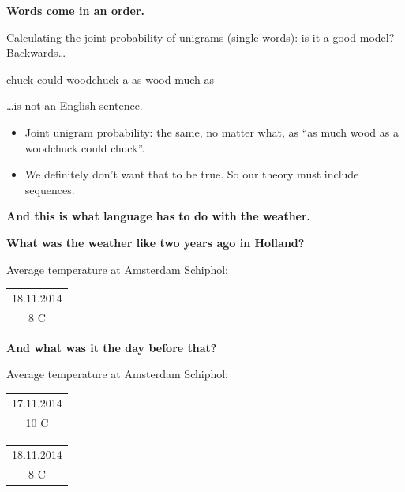 \documentclass{beamer}
\newcommand{\placard}[1]{
  \begin{frame}
    \begin{center}
      \huge
      \textbf{#1}
    \end{center}
  \end{frame}
}
\newcommand{\pagestepalt}[2]{
  \begin{frame}[t]
    \begin{minipage}[t][0.26\textheight][t]{\textwidth}
      \begin{center}
        \huge
        \textbf{#1}
      \end{center}
    \end{minipage}
    
    \begin{minipage}[t][0.7\textheight][c]{\textwidth}
      #2
    \end{minipage}
  \end{frame}
}
\begin{document}
\pagestepalt{Words come in an order.}{
  Calculating the joint probability of \alert{unigrams} (single words):
  is it a good \alert{model}?\pause \\
  Backwards\ldots
  \begin{center}
    \Large chuck could woodchuck a as wood much as
  \end{center}
  \ldots is not an English sentence. \pause
  \begin{itemize}
  \item Joint unigram probability: the same, no matter what, as ``as much wood as a woodchuck could chuck''.\pause
  \item We definitely don't want that to be true.  So our theory must include
    sequences.
  \end{itemize}
}

\placard{And this is what language has to do with the weather.}

\pagestepalt{What was the weather like two years ago in Holland?}{
  Average temperature at Amsterdam Schiphol:\\
  \begin{flushright}
    \begin{tabular}{|c|}
      \hline
      18.11.2014 \\
      {\Huge 8 C} \\
      \hline
   \end{tabular}
  \end{flushright}
}

\pagestepalt{And what was it the day before that?}{
  Average temperature at Amsterdam Schiphol:\\
  \begin{flushright}
    \begin{tabular}{|c|}
      \hline
      17.11.2014 \\
      {\Huge 10 C} \\
      \hline
    \end{tabular}
    \begin{tabular}{|c|}
      \hline
      18.11.2014 \\
      {\Huge 8 C} \\
      \hline
    \end{tabular}
  \end{flushright}
}
\end{document}
